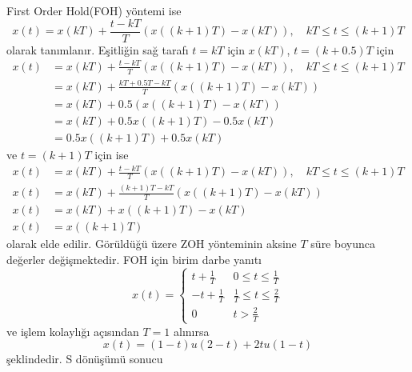 First Order Hold(FOH) yöntemi ise
\begin{equation}
    x(t)=x(kT)+\frac{t-kT}{T}(x((k+1)T)-x(kT)),\quad kT\leq t\leq (k+1)T
\end{equation}
olarak tanımlanır. Eşitliğin sağ tarafı $t=kT$ için $x(kT)$, $t=(k+0.5)T$ için 
\begin{equation}
\begin{split}
    x(t)&=x(kT)+\frac{t-kT}{T}(x((k+1)T)-x(kT)),\quad kT\leq t\leq (k+1)T\\
    &=x(kT)+\frac{kT+0.5T-kT}{T}(x((k+1)T)-x(kT))\\
    &=x(kT)+0.5(x((k+1)T)-x(kT))\\
    &=x(kT)+0.5x((k+1)T)-0.5x(kT)\\
    &=0.5x((k+1)T)+0.5x(kT)
\end{split}
\end{equation}
ve $t=(k+1)T$ için ise 
\begin{equation}
    \begin{split}
        x(t)&=x(kT)+\frac{t-kT}{T}(x((k+1)T)-x(kT)),\quad kT\leq t\leq (k+1)T\\
        x(t)&=x(kT)+\frac{(k+1)T-kT}{T}(x((k+1)T)-x(kT))\\
        x(t)&=x(kT)+x((k+1)T)-x(kT)\\
        x(t)&=x((k+1)T)
    \end{split}
\end{equation}
olarak elde edilir. Görüldüğü üzere ZOH yönteminin aksine $T$ süre boyunca değerler değişmektedir. FOH için birim darbe yanıtı
\begin{equation}
    x(t)=\begin{cases}
        t+\frac{1}{T} & 0\leq t\leq \frac{1}{T}\\
        -t+\frac{1}{T} & \frac{1}{T}\leq t\leq \frac{2}{T}\\
        0 & t>\frac{2}{T}
    \end{cases}
\end{equation}
ve işlem kolaylığı açısından $T=1$ alınırsa 
\begin{equation}
    x(t)=(1-t)u(2-t)+2tu(1-t)
\end{equation}
şeklindedir. S dönüşümü sonucu
